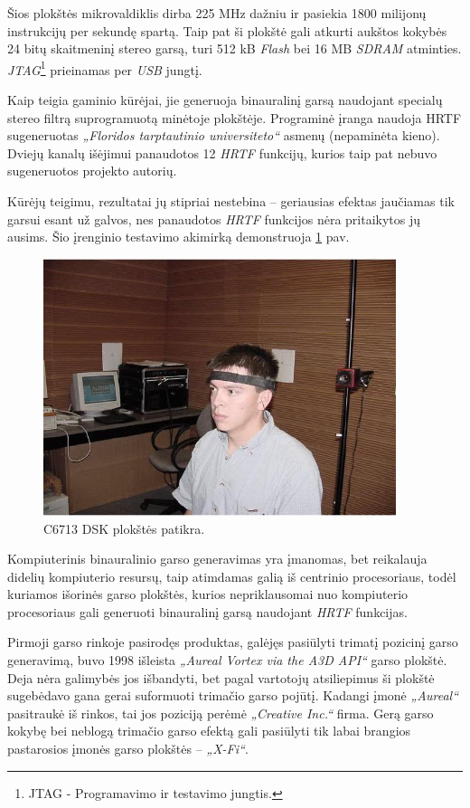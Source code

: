 \documentclass[]{vgtuef}
\begin{document}
Šios plokštės mikrovaldiklis dirba 225 MHz dažniu ir pasiekia 1800 milijonų instrukcijų per sekundę spartą. Taip pat ši plokštė gali atkurti aukštos kokybės 24 bitų skaitmeninį stereo garsą, turi 512 kB \textit{Flash} bei 16 MB \textit{SDRAM} atminties. \textit{JTAG}\footnote{JTAG - Programavimo ir testavimo jungtis.} prieinamas per \textit{USB} jungtį.

Kaip teigia gaminio kūrėjai, jie generuoja binauralinį garsą naudojant specialų stereo filtrą suprogramuotą minėtoje plokštėje. Programinė įranga naudoja HRTF sugeneruotas \textit{„Floridos tarptautinio universiteto“} asmenų (nepaminėta kieno). Dviejų kanalų išėjimui panaudotos 12 \textit{HRTF} funkcijų, kurios taip pat nebuvo sugeneruotos projekto autorių. 

Kūrėjų teigimu, rezultatai jų stipriai nestebina – geriausias efektas jaučiamas tik garsui esant už galvos, nes panaudotos \textit{HRTF} funkcijos nėra pritaikytos jų ausims. Šio įrenginio testavimo akimirką demonstruoja \ref{fig:C6713_dsk_board_checkout} pav.

\begin{figure}[!ht]
  \centering
  \includegraphics[width=390px]{img/c6713_patikra.jpg}
  \caption{C6713 DSK plokštės patikra.}
  \label{fig:C6713_dsk_board_checkout}
\end{figure}


Kompiuterinis binauralinio garso generavimas yra įmanomas, bet reikalauja didelių kompiuterio resursų, taip atimdamas galią iš centrinio procesoriaus, todėl kuriamos išorinės garso plokštės, kurios nepriklausomai nuo kompiuterio procesoriaus gali generuoti binauralinį garsą naudojant \textit{HRTF} funkcijas.

Pirmoji garso rinkoje pasirodęs produktas, galėjęs pasiūlyti trimatį pozicinį garso generavimą, buvo 1998 išleista \textit{„Aureal Vortex via the A3D API“} garso plokštė. Deja nėra  galimybės jos išbandyti, bet pagal vartotojų atsiliepimus ši plokštė sugebėdavo gana gerai suformuoti trimačio garso pojūtį. Kadangi įmonė \textit{„Aureal“} pasitraukė iš rinkos, tai jos poziciją perėmė \textit{„Creative Inc.“} firma. Gerą garso kokybę bei neblogą trimačio garso efektą gali pasiūlyti tik labai brangios pastarosios įmonės garso plokštės – \textit{„X-Fi“}. 
\end{document}
